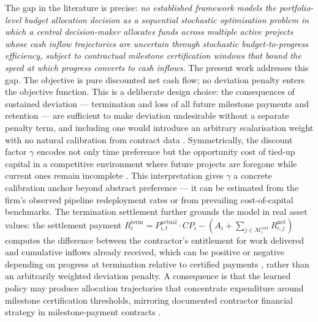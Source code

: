 The gap in the literature is precise: \emph{no established framework models the
portfolio-level budget allocation decision as a sequential stochastic
optimisation problem in which a central decision-maker allocates funds across
multiple active projects whose cash inflow trajectories are uncertain through
stochastic budget-to-progress efficiency, subject to contractual milestone
certification windows that bound the speed at which progress converts to cash
inflows.} The present work
addresses this gap. The objective is pure discounted net cash flow; no deviation penalty enters
the objective function. This is a deliberate design choice: the consequences
of sustained deviation --- termination and loss of all future milestone
payments and retention --- are sufficient to make deviation undesirable
without a separate penalty term, and including one would introduce an
arbitrary scalarisation weight with no natural calibration from contract data
\citep{Ng1999}. Symmetrically, the discount factor $\gamma$ encodes not only
time preference but the opportunity cost of tied-up capital in a competitive
environment where future projects are foregone while current ones remain
incomplete \citep{Damodaran2012}. This interpretation gives $\gamma$ a
concrete calibration anchor beyond abstract preference --- it can be estimated
from the firm's observed pipeline redeployment rates or from prevailing
cost-of-capital benchmarks. The termination settlement further grounds the model in real asset values: the
settlement payment $R_i^{\mathrm{term}} = P_{i,t}^{\mathrm{actual}} \cdot
CP_i - (A_i + \sum_{j \in \mathcal{M}_i^{\mathrm{cert}}} R_{i,j}^{\mathrm{net}})$
computes the difference between the contractor's entitlement for work delivered
and cumulative inflows already received, which can be positive or negative
depending on progress at termination relative to certified payments
\citep{Dixit1994, Huchzermeier2001}, rather than an arbitrarily weighted
deviation penalty. A consequence is that the learned policy may
produce allocation trajectories that concentrate expenditure around milestone
certification thresholds, mirroring documented contractor financial strategy
in milestone-payment contracts \citep{Kenley2009, Kaka1993, Arditi2005}.


